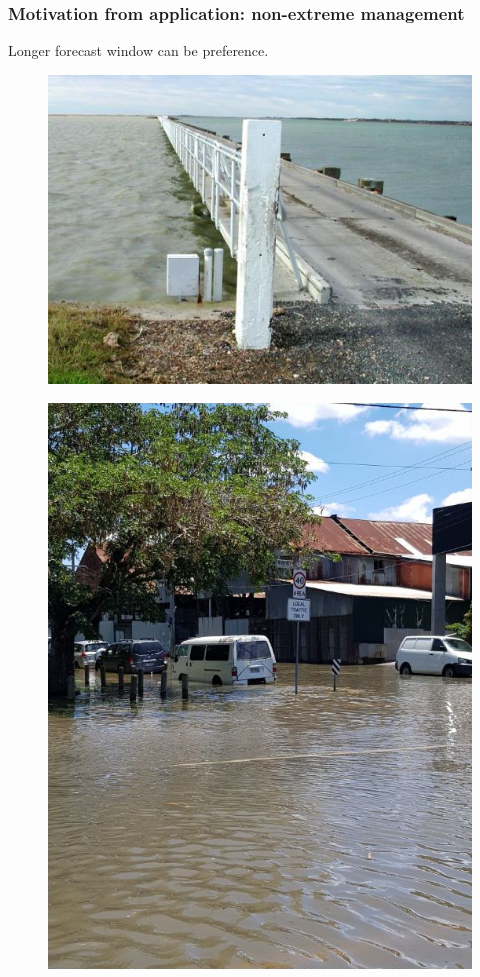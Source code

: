 \begin{frame}
\frametitle{Motivation from application: non-extreme management}
Longer forecast window can be preference.\\
\begin{minipage}{0.4\textwidth}
    \begin{figure}      
    \includegraphics[width=\textwidth]{figures/images/goolwa_ewe_island-environment_sa_gov_au.jpg}
    \end{figure}
\end{minipage}
\hfill
\begin{minipage}{0.4\textwidth}
    \begin{figure}      
     \includegraphics[width=\textwidth]{figures/images/sunnyFlood_ClarkJan2018Brisbane.png}

\end{figure}
\end{minipage}
\end{frame}

